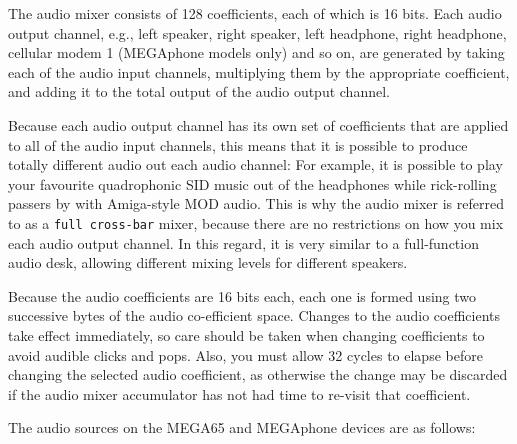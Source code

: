 The audio mixer consists of 128 coefficients, each of which is 16
bits.  Each audio output channel, e.g., left speaker, right speaker,
left headphone, right headphone, cellular modem 1 (MEGAphone models
only) and so on, are generated by taking each of the audio input
channels, multiplying them by the appropriate coefficient, and adding
it to the total output of the audio output channel.

Because each
audio output channel has its own set of coefficients that are applied
to all of the audio input channels, this means that it is possible to
produce totally different audio out each audio channel: For example,
it is possible to play your favourite quadrophonic SID music out of
the headphones while rick-rolling passers by with Amiga-style MOD
audio.  This is why the audio mixer is referred to as a {\tt full
  cross-bar} mixer, because there are no restrictions on how you mix
each audio output channel.  In this regard, it is very similar to a
full-function audio desk, allowing different mixing levels for
different speakers.

Because the audio coefficients are 16 bits each, each one is formed
using two successive bytes of the audio co-efficient space.  Changes
to the audio coefficients take effect immediately, so care should be
taken when changing coefficients to avoid audible clicks and pops.
Also, you must allow 32 cycles to elapse before changing the selected
audio coefficient, as otherwise the change may be discarded if the
audio mixer accumulator has not had time to re-visit that coefficient.

The audio sources on the MEGA65 and MEGAphone devices are as follows:

